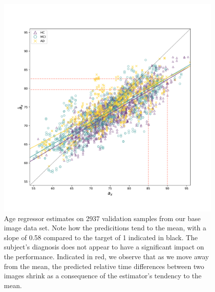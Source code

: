 \begin{figure}
	\centering
	\includegraphics[width=.85\linewidth]{images/age_plots/xr_xrhat} 
	\vspace*{-15pt}
	\caption{Age regressor estimates on 2937 validation samples from our base image data set. Note how the predicitions tend to the mean, with a slope of 0.58 compared to the target of 1 indicated in black. The subject's diagnosis does not appear to have a significant impact on the performance. Indicated in red, we observe that as we move away from the mean, the predicted relative time differences between two images shrink as a consequence of the estimator's tendency to the mean.}
	\label{fig:expregxrxrhat}
\end{figure}

